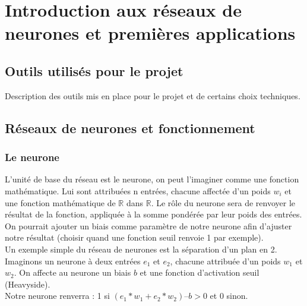 


\chapter{Introduction aux réseaux de neurones et premières applications}

\section{Outils utilisés pour le projet}

Description des outils mis en place pour le projet et de certains choix techniques.

\section{Réseaux de neurones et fonctionnement}

\subsection{Le neurone} %
\label{sub:le_neurone}
L’unité de base du réseau est le neurone, on peut l’imaginer comme une fonction mathématique. Lui sont attribuées n entrées, chacune affectée d’un poids $w_i$ et une fonction mathématique de $\mathbb{R}$ dans $\mathbb{R}$. Le rôle du neurone sera de renvoyer le résultat de la fonction, appliquée à la somme pondérée par leur poids des entrées. On pourrait ajouter un biais comme paramètre de notre neurone afin d’ajuster notre résultat (choisir quand une fonction seuil renvoie 1 par exemple).\\

Un exemple simple du réseau de neurones est la séparation d’un plan en 2.\\
Imaginons un neurone à deux entrées $e_1$ et $e_2$, chacune attribuée d’un poids $w_1$ et $w_2$. On affecte au neurone un biais $b$ et une fonction d’activation seuil (Heavyside).\\
Notre neurone renverra : 1 si $(e_1*w_1+e_2*w_2) – b >0$ et 0 sinon.\\

